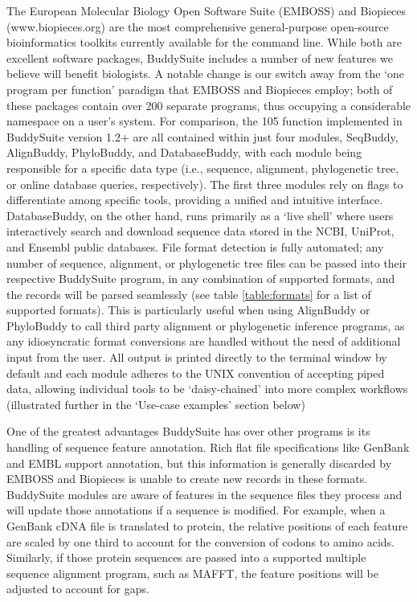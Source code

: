 \documentclass[nogrid]{MBE_article}%
\begin{document}
The European Molecular Biology Open Software Suite (EMBOSS) \cite{Rice:2000wr} and Biopieces (www.biopieces.org) are the most comprehensive general-purpose open-source bioinformatics toolkits currently available for the command line. While both are excellent software packages, BuddySuite includes a number of new features we believe will benefit biologists. A notable change is our switch away from the `one program per function' paradigm that EMBOSS and Biopieces employ; both of these packages contain over 200 separate programs, thus occupying a considerable namespace on a user's system. For comparison, the 105 function implemented in BuddySuite version 1.2+ are all contained within just four modules, SeqBuddy, AlignBuddy, PhyloBuddy, and DatabaseBuddy, with each module being responsible for a specific data type (i.e., sequence, alignment, phylogenetic tree, or online database queries, respectively). The first three modules rely on flags to differentiate among specific tools, providing a unified and intuitive interface. DatabaseBuddy, on the other hand, runs primarily as a `live shell' where users interactively search and download sequence data stored in the NCBI, UniProt, and Ensembl public databases. File format detection is fully automated; any number of sequence, alignment, or phylogenetic tree files can be passed into their respective BuddySuite program, in any combination of supported formats, and the records will be parsed seamlessly (see table \ref{table:formats} for a list of supported formats). This is particularly useful when using AlignBuddy or PhyloBuddy to call third party alignment or phylogenetic inference programs, as any idiosyncratic format conversions are handled without the need of additional input from the user. All output is printed directly to the terminal window by default and each module adheres to the UNIX convention of accepting piped data, allowing individual tools to be `daisy-chained' into more complex workflows (illustrated further in the `Use-case examples' section below)

One of the greatest advantages BuddySuite has over other programs is its handling of sequence feature annotation. Rich flat file specifications like GenBank and EMBL support annotation, but this information is generally discarded by EMBOSS and Biopieces is unable to create new records in these formats. BuddySuite modules are aware of features in the sequence files they process and will update those annotations if a sequence is modified. For example, when a GenBank cDNA file is translated to protein, the relative positions of each feature are scaled by one third to account for the conversion of codons to amino acids. Similarly, if those protein sequences are passed into a supported multiple sequence alignment program, such as MAFFT, the feature positions will be adjusted to account for gaps.
\end{document}
